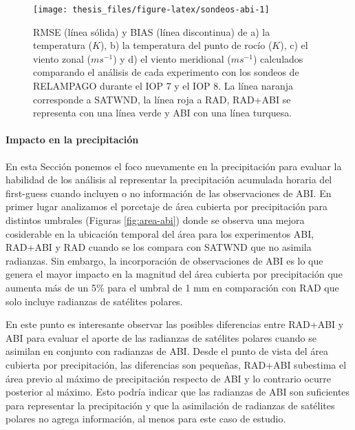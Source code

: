 \documentclass[12pt,oneside,a4paper]{reedthesis}
\begin{document}
\begin{figure}

{\centering \texttt{[image: thesis\_files/figure-latex/sondeos-abi-1]} 

}

\caption{RMSE (línea sólida) y BIAS (línea discontinua) de a) la temperatura (\(K\)), b) la temperatura del punto de rocío (\(K\)), c) el viento zonal (\(m s^{-1}\)) y d) el viento meridional (\(m s^{-1}\)) calculados comparando el análisis de cada experimento con los sondeos de RELAMPAGO durante el IOP 7 y el IOP 8. La línea naranja corresponde a SATWND, la línea roja a RAD, RAD+ABI se representa con una línea verde y ABI con una línea turquesa.}\label{fig:sondeos-abi}
\end{figure}
\hypertarget{impacto-en-la-precipitaciuxf3n}{%
\paragraph{Impacto en la precipitación}\label{impacto-en-la-precipitaciuxf3n}}

En esta Sección ponemos el foco nuevamente en la precipitación para evaluar la habilidad de los análisis al representar la precipitación acumulada horaria del first-guess cuando incluyen o no información de las observaciones de ABI. En primer lugar analizamos el porcetaje de área cubierta por precipitación para distintos umbrales (Figuras \ref{fig:area-abi}) donde se observa una mejora cosiderable en la ubicación temporal del área para los experimentos ABI, RAD+ABI y RAD cuando se los compara con SATWND que no asimila radianzas. Sin embargo, la incorporación de observaciones de ABI es lo que genera el mayor impacto en la magnitud del área cubierta por precipitación que aumenta más de un 5\% para el umbral de 1 mm en comparación con RAD que solo incluye radianzas de satélites polares.

En este punto es interesante observar las posibles diferencias entre RAD+ABI y ABI para evaluar el aporte de las radianzas de satélites polares cuando se asimilan en conjunto con radianzas de ABI. Desde el punto de vista del área cubierta por precipitación, las diferencias son pequeñas, RAD+ABI subestima el área previo al máximo de precipitación respecto de ABI y lo contrario ocurre posterior al máximo. Esto podría indicar que las radianzas de ABI son suficientes para representar la precipitación y que la asimilación de radianzas de satélites polares no agrega información, al menos para este caso de estudio.
\end{document}
